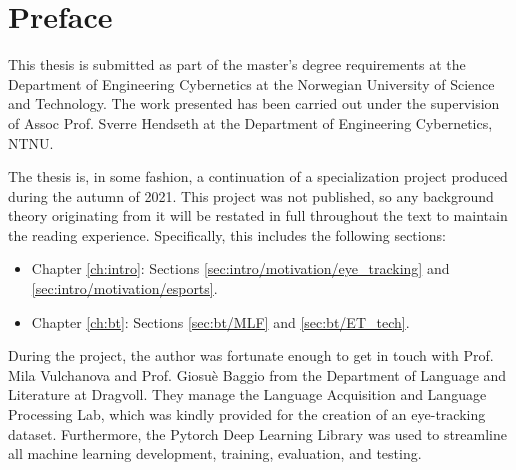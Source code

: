 \chapter*{Preface}

This thesis is submitted as part of the master's degree requirements at the Department of Engineering Cybernetics at the Norwegian University of Science and Technology. The work presented has been carried out under the supervision of Assoc Prof. Sverre Hendseth at the Department of Engineering Cybernetics, NTNU.


The thesis is, in some fashion, a continuation of a specialization project produced during the autumn of 2021. This project was not published, so any background theory originating from it will be restated in full throughout the text to maintain the reading experience. Specifically, this includes the following sections:
\begin{itemize}
    \item Chapter \ref{ch:intro}: Sections \ref{sec:intro/motivation/eye_tracking} and \ref{sec:intro/motivation/esports}.
    \item Chapter \ref{ch:bt}: Sections \ref{sec:bt/MLF} and \ref{sec:bt/ET_tech}.
\end{itemize}


During the project, the author was fortunate enough to get in touch with Prof. Mila Vulchanova and Prof. Giosuè Baggio from the Department of Language and Literature at Dragvoll. They manage the Language Acquisition and Language Processing Lab, which was kindly provided for the creation of an eye-tracking dataset. Furthermore, the Pytorch Deep Learning Library \cite{paszke2019} was used to streamline all machine learning development, training, evaluation, and testing.

